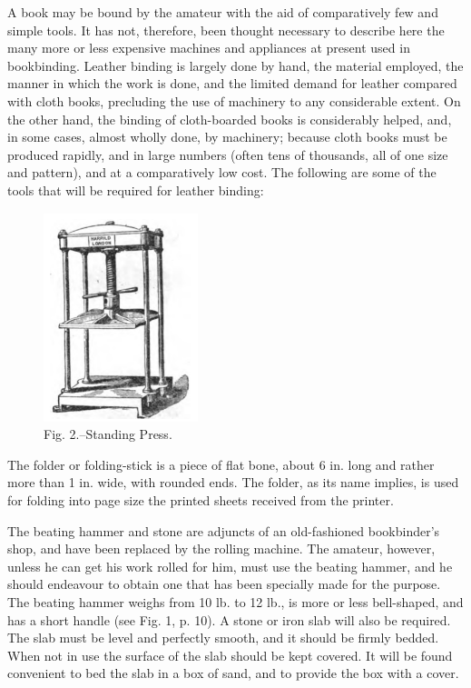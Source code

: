 \documentclass[twoside]{book}
\begin{document}
A book may be bound by the amateur with the
aid of comparatively few and simple tools. It has
not, therefore, been thought necessary to describe
here the many more or less expensive machines and
appliances at present used in bookbinding. Leather
binding is largely done by hand, the material \pagebreak
employed, the manner in which the work is done, and
the limited demand for leather compared with cloth
books, precluding the use of machinery to any
considerable extent. On the other hand, the binding
of cloth-boarded books is considerably helped, and,
in some cases, almost wholly done, by machinery;
because cloth books must be produced rapidly, and
in large numbers (often tens of thousands, all of one
size and pattern), and at a comparatively low cost.
The following are some of the tools that will be
required for leather binding:
	\begin{figure}[h]
		\centering
		\includegraphics[width=0.4\textwidth]{Figures/_002.png}
		\caption*{Fig. 2.--Standing Press.}
	\end{figure}
The folder or folding-stick is a piece of flat bone,
about 6 in. long and rather more than 1 in. wide,
with rounded ends. The folder, as its name implies,
is used for folding into page size the printed sheets
received from the printer.

The beating hammer and stone are adjuncts of
an old-fashioned bookbinder's shop, and have been
replaced by the rolling machine. The amateur,
however, unless he can get his work rolled for him,
must use the beating hammer, and he should endeavour
to obtain one that has been specially made
\pagebreak
for the purpose. The beating hammer weighs from
10 lb. to 12 lb., is more or less bell-shaped, and has a
short handle (see Fig. 1, p. 10). A stone or iron slab
will also be required. The slab must be level and
perfectly smooth, and it should be firmly bedded.
When not in use the surface of the slab should be
kept covered. It will be found convenient to bed the
slab in a box of sand, and to provide the box with
a cover.
\end{document}
